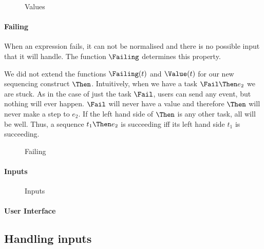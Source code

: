 \begin{figure}[h]
  \small \raggedright
  \caption{Values} \label{fig:observation-value}
\end{figure}



\paragraph{Failing}

When an expression fails, it can not be normalised and there is no possible
input that it will handle. The function $\Failing$ determines this property.

We did not extend the functions $\Failing(t)$ and $\Value(t)$ for our new sequencing construct $\Then$.
Intuitively,
when we have a task $\Fail \Then e_2$ we are stuck.
As in the case of just the task $\Fail$,
users can send any event,
but nothing will ever happen.
$\Fail$ will never have a value
and therefore $\Then$ will never make a step to $e_2$.
If the left hand side of $\Then$ is any other task,
all will be well.
Thus,
a sequence $t_1 \Then e_2$ is succeeding iff its left hand side $t_1$ is succeeding.

\begin{figure}[h]
  \small \raggedright
  \caption{Failing} \label{fig:observation-failing}
\end{figure}



\paragraph{Inputs}


\begin{figure}[h]
  \small \raggedright
  \caption{Inputs} \label{fig:observation-value}
\end{figure}



\paragraph{User Interface}




\subsection{Handling inputs}
\label{sec:handling}

